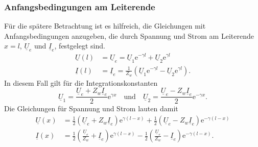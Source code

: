 \documentclass[paper=a4, parskip=half-, ngerman, fontsize=11pt]{scrreprt}
\begin{document}
\subsubsection{Anfangsbedingungen am Leiterende}

Für die spätere Betrachtung ist es hilfreich, die Gleichungen mit Anfangsbedingungen anzugeben, die durch Spannung und
Strom am Leiterende $x=l$, $\underline{U}_{e}$ und $\underline{I}_{e}$, festgelegt sind.
\begin{align*}
    \underline{U}(l) &= \underline{U}_{e} = \underline{U}_{1} \mathrm{e}^{- \gamma l}
    +
    \underline{U}_{2} \mathrm{e}^{ \gamma l} \\[1ex]
    \underline{I}(l) &= \underline{I}_{e} = \frac{1}{Z_{w}}
    \left(
    \underline{U}_{1} \mathrm{e}^{- \gamma l}
    -
    \underline{U}_{2} \mathrm{e}^{ \gamma l}
    \right).
\end{align*}
In diesem Fall gilt für die Integrationskonstanten
\[ \underline{U}_{1} = \frac{\underline{U}_{e} + Z_{w} \underline{I}_{e}}{2} \mathrm{e}^{\gamma x} \quad \text{und}
\quad \underline{U}_{2} = \frac{\underline{U}_{e} - Z_{w} \underline{I}_{e}}{2} \mathrm{e}^{- \gamma x}. \]
Die Gleichungen für Spannung und Strom lauten damit
\begin{align}
    \underline{U}(x) &=
    \frac{1}{2} \left( \underline{U}_{e} + Z_{w} \underline{I}_{e} \right) \mathrm{e}^{\gamma (l - x)}
    +
    \frac{1}{2} \left( \underline{U}_{e} - Z_{w} \underline{I}_{e} \right) \mathrm{e}^{- \gamma (l - x)} \label{eq:UxE}
    \\[1ex]
    \underline{I}(x) &=
    \frac{1}{2} \left( \frac{\underline{U}_{e}}{Z_{w}} + \underline{I}_{e} \right) \mathrm{e}^{\gamma (l - x)}
    -
    \frac{1}{2} \left( \frac{\underline{U}_{e}}{Z_{w}} - \underline{I}_{e} \right) \mathrm{e}^{- \gamma (l - x)}
    \label{eq:IxE} .
\end{align}
\end{document}
